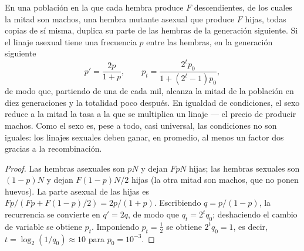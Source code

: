 \begin{theorem}\label{thm:b2:asexual-reproduction:twofold}
En una población en la que cada hembra produce $F$ descendientes, de los
cuales la mitad son machos, una hembra mutante asexual que produce $F$
hijas, todas copias de sí misma, duplica su parte de las hembras de la
generación siguiente. Si el linaje asexual tiene una frecuencia $p$ entre
las hembras, en la generación siguiente
\[
p' = \frac{2p}{1 + p}, \qquad p_t = \frac{2^t p_0}{1 + (2^t - 1)p_0},
\]
de modo que, partiendo de una de cada mil, alcanza la mitad de la
población en diez generaciones y la totalidad poco después. En igualdad
de condiciones, el sexo reduce a la mitad la tasa a la que se multiplica
un linaje --- el precio de producir machos. Como el sexo es, pese a
todo, casi universal, las condiciones no son iguales: los linajes
sexuales deben ganar, en promedio, al menos un factor dos gracias a la
recombinación.
\end{theorem}
\begin{proof}
Las hembras asexuales son $pN$ y dejan $FpN$ hijas; las hembras sexuales
son $(1 - p)N$ y dejan $F(1 - p)N/2$ hijas (la otra mitad son machos, que
no ponen huevos). La parte asexual de las hijas es
$Fp/(Fp + F(1 - p)/2) = 2p/(1 + p)$. Escribiendo $q = p/(1 -
p)$, la recurrencia se convierte en $q' = 2q$, de modo que $q_t = 2^t q_0$;
deshaciendo el cambio de variable se obtiene $p_t$. Imponiendo $p_t = \tfrac12$ se obtiene
$2^t q_0 = 1$, es decir,
$t = \log_2(1/q_0) \approx 10$ para $p_0 = 10^{-3}$.
\end{proof}

